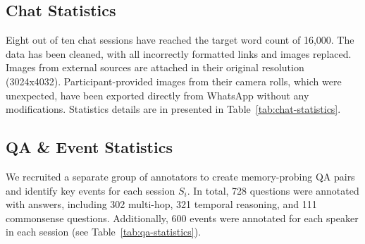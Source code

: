 \subsection{Chat Statistics}
\label{appendix:chat-statistics}
Eight out of ten chat sessions have reached the target word count of 16,000. 
The data has been cleaned, with all incorrectly formatted links and images replaced. Images from external sources are attached in their original resolution (3024x4032). 
Participant-provided images from their camera rolls, which were unexpected, have been exported directly from WhatsApp without any modifications.
Statistics details are in presented in Table~\ref{tab:chat-statistics}.

\begin{table}[h!] %
\centering
{}
\captionsetup{justification=centering} %
\caption{\textbf{Chat Statistics}}
\label{tab:chat-statistics}
\vspace{-0.3cm}
\end{table}


\subsection{QA \& Event Statistics}
\label{appendix:qa-statistics}
We recruited a separate group of annotators to create memory-probing QA pairs and identify key events for each session $S_i$.
In total, 728 questions were annotated with answers, including 302 multi-hop, 321 temporal reasoning, and 111 commonsense questions.
Additionally, 600 events were annotated for each speaker in each session (see Table~\ref{tab:qa-statistics}).

